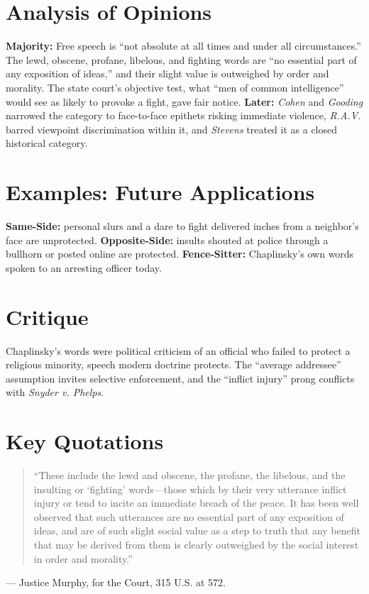 \documentclass[12pt]{article}
\begin{document}
\section{Analysis of Opinions}
\textbf{Majority:} Free speech is ``not absolute at all times and under all circumstances.'' The lewd, obscene, profane, libelous, and fighting words are ``no essential part of any exposition of ideas,'' and their slight value is outweighed by order and morality. The state court's objective test, what ``men of common intelligence'' would see as likely to provoke a fight, gave fair notice. \textbf{Later:} \textit{Cohen} and \textit{Gooding} narrowed the category to face-to-face epithets risking immediate violence, \textit{R.A.V.} barred viewpoint discrimination within it, and \textit{Stevens} treated it as a closed historical category.

\section{Examples: Future Applications}
\textbf{Same-Side:} personal slurs and a dare to fight delivered inches from a neighbor's face are unprotected. \textbf{Opposite-Side:} insults shouted at police through a bullhorn or posted online are protected. \textbf{Fence-Sitter:} Chaplinsky's own words spoken to an arresting officer today.

\section{Critique}
Chaplinsky's words were political criticism of an official who failed to protect a religious minority, speech modern doctrine protects. The ``average addressee'' assumption invites selective enforcement, and the ``inflict injury'' prong conflicts with \textit{Snyder v. Phelps}.

\section{Key Quotations}
\begin{quote}
``These include the lewd and obscene, the profane, the libelous, and the insulting or `fighting' words---those which by their very utterance inflict injury or tend to incite an immediate breach of the peace. It has been well observed that such utterances are no essential part of any exposition of ideas, and are of such slight social value as a step to truth that any benefit that may be derived from them is clearly outweighed by the social interest in order and morality.''
\end{quote}
\noindent --- Justice Murphy, for the Court, 315 U.S. at 572.
\end{document}
